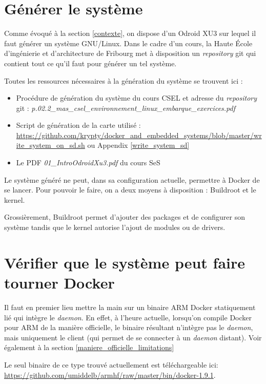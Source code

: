 \documentclass[11pt,a4paper,oneside]{report}
\newcommand{\school}{Haute École d'ingénierie et d'architecture de Fribourg }
\begin{document}
\section{Générer le système}

Comme évoqué à la section \ref{contexte}, on dispose d'un Odroid XU3 sur lequel il faut générer un système GNU/Linux. Dans le cadre d'un cours, la \school met à disposition un \emph{repository} git qui contient tout ce qu'il faut pour générer un tel système.

Toutes les ressources nécessaires à la génération du système se trouvent ici :

\begin{itemize}
  \item Procédure de génération du système du cours CSEL et adresse du \textit{repository} git : \emph{\newline p.02.2\_mas\_csel\_environnement\_linux\_embarque\_exercices.pdf}
  \item Script de génération de la carte utilisé : \url{https://github.com/krypty/docker\_and\_embedded\_systems/blob/master/write\_system\_on\_sd.sh} ou Appendix \ref{write_system_sd}
  \item Le PDF \emph{01\_IntroOdroidXu3.pdf} du cours SeS
\end{itemize}

Le système généré ne peut, dans sa configuration actuelle, permettre à Docker de se lancer. Pour pouvoir le faire, on a deux moyens à disposition : Buildroot et le kernel.

Grossièrement, Buildroot permet d'ajouter des packages et de configurer son système tandis que le kernel autorise l'ajout de modules ou de drivers.

\section{Vérifier que le système peut faire tourner Docker}

Il faut en premier lieu mettre la main sur un binaire ARM Docker statiquement lié qui intègre le \emph{daemon}. En effet, à l'heure actuelle, lorsqu'on compile Docker pour ARM de la manière officielle, le binaire résultant n'intègre pas le \emph{daemon}, mais uniquement le client (qui permet de se connecter à un \emph{daemon} distant). Voir également à la section \ref{maniere_officielle_limitations}

Le seul binaire de ce type trouvé actuellement est téléchargeable ici: \url{https://github.com/umiddelb/armhf/raw/master/bin/docker-1.9.1}\label{binaire_arm}.
\end{document}
